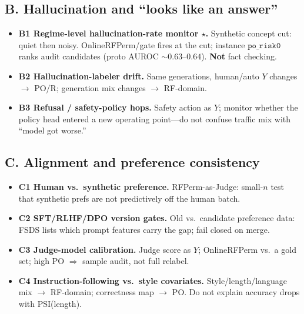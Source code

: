 \documentclass[11pt,a4paper]{article}
\begin{document}
\subsection{B. Hallucination and ``looks like an answer''}
\begin{itemize}
  \item \textbf{B1 Regime-level hallucination-rate monitor \(\star\).} Synthetic concept cut: quiet then noisy. OnlineRFPerm/gate fires at the cut; instance \(\texttt{po\_risk0}\) ranks audit candidates (proto AUROC \(\sim 0.63\)--\(0.64\)). \textbf{Not} fact checking.
  \item \textbf{B2 Hallucination-labeler drift.} Same generations, human/auto \(Y\) changes \(\to\) PO/R; generation mix changes \(\to\) RF-domain.
  \item \textbf{B3 Refusal / safety-policy hops.} Safety action as \(Y\); monitor whether the policy head entered a new operating point---do not confuse traffic mix with ``model got worse.''
\end{itemize}

\subsection{C. Alignment and preference consistency}
\begin{itemize}
  \item \textbf{C1 Human vs.\ synthetic preference.} RFPerm-as-Judge: small-\(n\) test that synthetic prefs are not predictively off the human batch.
  \item \textbf{C2 SFT/RLHF/DPO version gates.} Old vs.\ candidate preference data: FSDS lists which prompt features carry the gap; fail closed on merge.
  \item \textbf{C3 Judge-model calibration.} Judge score as \(Y\); OnlineRFPerm vs.\ a gold set; high PO \(\Rightarrow\) sample audit, not full relabel.
  \item \textbf{C4 Instruction-following vs.\ style covariates.} Style/length/language mix \(\to\) RF-domain; correctness map \(\to\) PO. Do not explain accuracy drops with PSI(length).
\end{itemize}
\end{document}
